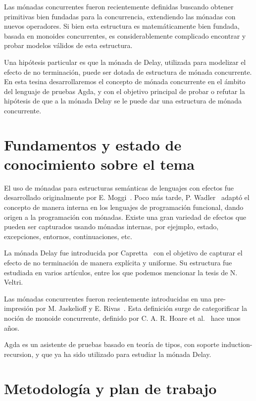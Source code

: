 \documentclass[11pt,a4paper]{article}
\begin{document}
Las mónadas concurrentes fueron recientemente definidas buscando
obtener primitivas bien fundadas para la concurrencia, extendiendo las
mónadas con nuevos operadores. Si bien esta estructura es
matemáticamente bien fundada, basada en monoides concurrentes, es
considerablemente complicado encontrar y probar modelos válidos de
esta estructura.

Una hipótesis particular es que la mónada de Delay, utilizada para
modelizar el efecto de no terminación, puede ser dotada de estructura
de mónada concurrente. En esta tesina desarrollaremos el concepto de
mónada concurrente en el ámbito del lenguaje de pruebas Agda, y con el
objetivo principal de probar o refutar la hipótesis de que a la mónada
Delay se le puede dar una estructura de mónada concurrente.

\section{Fundamentos y estado de conocimiento sobre el tema}

El uso de mónadas para estructuras semánticas de lenguajes con efectos
fue desarrollado originalmente por E. Moggi~\cite{Mog:CLM,
  Mog:NCM}. Poco más tarde, P. Wadler~\cite{Wad:EFP} adaptó el
concepto de manera interna en los lenguajes de programación funcional,
dando origen a la programación con mónadas. Existe una gran variedad
de efectos que pueden ser capturados usando mónadas internas, por
ejejmplo, estado, excepciones, entornos, continuaciones, etc.

La mónada Delay fue introducida por Capretta~\cite{Cap:GRCT} con el
objetivo de capturar el efecto de no terminación de manera explícita y
uniforme. Su estructura fue estudiada en varios artículos, entre los
que podemos mencionar la tesis de N. Veltri.

Las mónadas concurrentes fueron recientemente introducidas en una
pre-impresión por M. Jaskelioff y E. Rivas~\cite{RJ:MM}. Esta
definición surge de categorificar la noción de monoide concurrente,
definido por C. A. R. Hoare et al.~\cite{HHMOHPS:concmonoid} hace unos
años.

Agda es un asistente de pruebas basado en teoría de tipos, con soporte
induction-recursion, y que ya ha sido utilizado para estudiar la
mónada Delay.

\section{Metodología y plan de trabajo}
\end{document}
